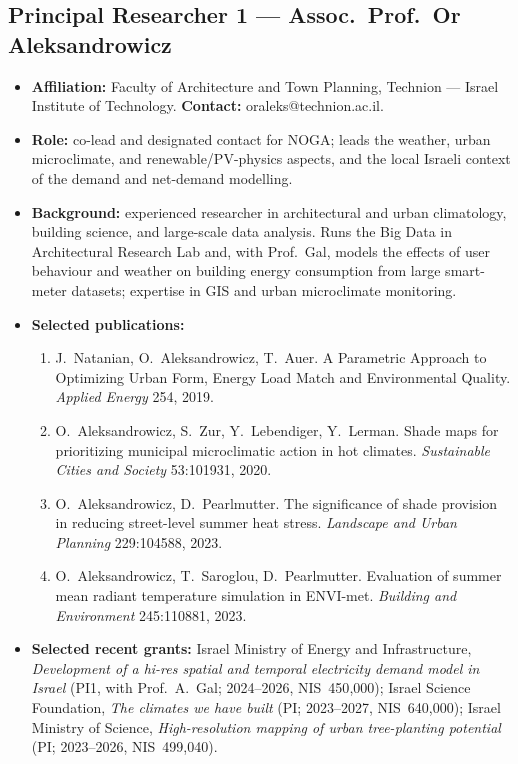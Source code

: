\documentclass[12pt,a4paper]{article}
\begin{document}
\subsection*{Principal Researcher 1 --- Assoc.\ Prof.\ Or Aleksandrowicz}
\begin{itemize}[leftmargin=1.4em]
    \item \textbf{Affiliation:} Faculty of Architecture and Town Planning, Technion ---
          Israel Institute of Technology. \textbf{Contact:} oraleks@technion.ac.il.
    \item \textbf{Role:} co-lead and designated contact for NOGA; leads the weather, urban
          microclimate, and renewable/PV-physics aspects, and the local Israeli context of
          the demand and net-demand modelling.
    \item \textbf{Background:} experienced researcher in architectural and urban
          climatology, building science, and large-scale data analysis. Runs the Big Data
          in Architectural Research Lab and, with Prof.\ Gal, models the effects of user
          behaviour and weather on building energy consumption from large smart-meter
          datasets; expertise in GIS and urban microclimate monitoring.
    \item \textbf{Selected publications:}
    \begin{enumerate}[leftmargin=1.6em,nosep]
        \item J.\ Natanian, O.\ Aleksandrowicz, T.\ Auer. A Parametric Approach to
              Optimizing Urban Form, Energy Load Match and Environmental Quality.
              \emph{Applied Energy} 254, 2019.
        \item O.\ Aleksandrowicz, S.\ Zur, Y.\ Lebendiger, Y.\ Lerman. Shade maps for
              prioritizing municipal microclimatic action in hot climates.
              \emph{Sustainable Cities and Society} 53:101931, 2020.
        \item O.\ Aleksandrowicz, D.\ Pearlmutter. The significance of shade provision in
              reducing street-level summer heat stress. \emph{Landscape and Urban Planning}
              229:104588, 2023.
        \item O.\ Aleksandrowicz, T.\ Saroglou, D.\ Pearlmutter. Evaluation of summer mean
              radiant temperature simulation in ENVI-met. \emph{Building and Environment}
              245:110881, 2023.
    \end{enumerate}
    \item \textbf{Selected recent grants:} Israel Ministry of Energy and Infrastructure,
          \emph{Development of a hi-res spatial and temporal electricity demand model in
          Israel} (PI1, with Prof.\ A.\ Gal; 2024--2026, NIS~450{,}000); Israel Science
          Foundation, \emph{The climates we have built} (PI; 2023--2027, NIS~640{,}000);
          Israel Ministry of Science, \emph{High-resolution mapping of urban tree-planting
          potential} (PI; 2023--2026, NIS~499{,}040).
\end{itemize}
\end{document}
